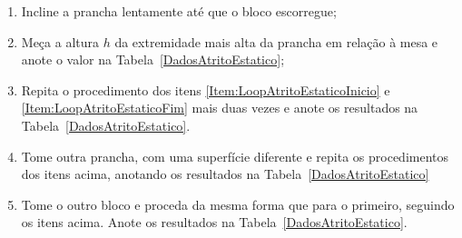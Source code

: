 \begin{enumerate}
	\item Incline a prancha lentamente até que o bloco escorregue;\label{Item:LoopAtritoEstaticoInicio}
	\item Meça a altura $h$ da extremidade mais alta da prancha em relação à mesa e anote o valor na Tabela~\ref{DadosAtritoEstatico};\label{Item:LoopAtritoEstaticoFim}
	\item Repita o procedimento dos itens \ref{Item:LoopAtritoEstaticoInicio} e \ref{Item:LoopAtritoEstaticoFim} mais duas vezes e anote os resultados na Tabela~\ref{DadosAtritoEstatico}.
	\item Tome outra prancha, com uma superfície diferente e repita os procedimentos dos itens acima, anotando os resultados na Tabela~\ref{DadosAtritoEstatico}
	\item Tome o outro bloco e proceda da mesma forma que para o primeiro, seguindo os itens acima. Anote os resultados na Tabela~\ref{DadosAtritoEstatico}.
\end{enumerate}


